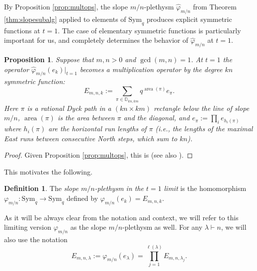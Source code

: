 \documentclass{amsart}
\numberwithin{equation}{section}
\newtheorem{proposition}[lemma]{Proposition}%
\theoremstyle{definition}
\newtheorem{definition}[lemma]{Definition}%
\def\bar{\overline}
\def\tilde{\widetilde}
\def\Sym{{\mathrm{Sym}}}
\renewcommand{\th}{\tilde{h}}
\newcommand{\Dyck}{\mathbb{D}}
\DeclareMathOperator{\area}{\mathrm{area}}
\begin{document}
By Proposition \ref{prop:multops}, the slope $m/n$-plethysm $\widehat{\varphi}_{m/n}$ from Theorem \ref{thm:slopesubalg} applied to elements of $\Sym_q$ produces explicit symmetric functions at $t=1$. The case of elementary symmetric functions is particularly important for us, and completely determines the behavior of $\widehat{\varphi}_{m/n}$ at $t=1$.
\begin{proposition}
\label{prop:Emnk}
Suppose that $m,n>0$ and $\gcd(m,n)=1$. At $t=1$ the operator $\widehat{\varphi}_{m/n}(e_k)|_{t=1}$ becomes a multiplication operator by the degree $kn$ symmetric function:
$$
E_{m,n,k}:=\sum_{\pi\in \Dyck_{kn,km}}q^{\area(\pi)}e_{\pi}.
$$
Here $\pi$ is a rational Dyck path in a $(kn\times km)$ rectangle below the line of slope $m/n$, $\area(\pi)$ is the area between $\pi$ and the diagonal, and $e_\pi:=\prod_{i} e_{h_i(\pi)}$ where $h_i(\pi)$ are the horizontal run lengths of $\pi$ (i.e., the lengths of the maximal East runs between consecutive North steps, which sum to $kn$).
\end{proposition}
\begin{proof}
Given Proposition \ref{prop:multops}, this is \cite[Eq. (4.5.4)]{BergeronSurvey} (see also \cite{BGLX}). 
\end{proof}
This motivates the following.
\begin{definition}
\label{def:mnpleth}
The {\em slope $m/n$-plethysm in the $t=1$ limit} is the homomorphism
$\varphi_{m/n}: \Sym_{q}\to \Sym_{q}$
 defined by $\varphi_{m/n}(e_k)=E_{m,n,k}$. 
\end{definition}
As it will be always clear from the notation and context, we will refer to this limiting version $\varphi_{m/n}$ as the slope $m/n$-plethysm as well.
For any $\lambda\vdash n$, we will also use the notation
    $$E_{m,n,\lambda}:=\varphi_{m/n}(e_\lambda)=\prod_{j=1}^{\ell(\lambda)} E_{m,n,\lambda_j}.$$


\end{document}
